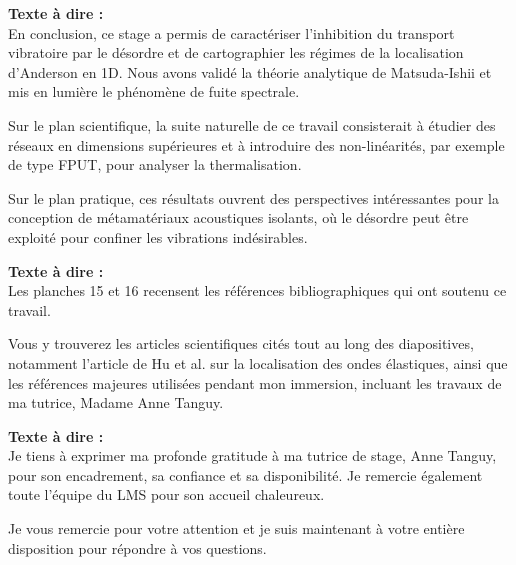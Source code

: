 \documentclass[11pt,a4paper]{article}
\begin{document}
\begin{tcolorbox}[colback=blue!5,colframe=blue!75!black,title=Slide 2 : Table des Matières --- 0:45 à 1:15]
\begin{tcolorbox}[colback=blue!5,colframe=blue!75!black,title=Slide 14 : Conclusion et Perspectives --- 13:00 à 14:15]
\textbf{Texte à dire :} \\
\og  En conclusion, ce stage a permis de caractériser l'inhibition du transport vibratoire par le désordre et de cartographier les régimes de la localisation d'Anderson en 1D. Nous avons validé la théorie analytique de Matsuda-Ishii et mis en lumière le phénomène de fuite spectrale.

Sur le plan scientifique, la suite naturelle de ce travail consisterait à étudier des réseaux en dimensions supérieures et à introduire des non-linéarités, par exemple de type FPUT, pour analyser la thermalisation. 

Sur le plan pratique, ces résultats ouvrent des perspectives intéressantes pour la conception de métamatériaux acoustiques isolants, où le désordre peut être exploité pour confiner les vibrations indésirables. \fg{}
\end{tcolorbox}

\begin{tcolorbox}[colback=blue!5,colframe=blue!75!black,title=Slides 15-16 : Références --- 14:15 à 14:45]
\textbf{Texte à dire :} \\
\og  Les planches 15 et 16 recensent les références bibliographiques qui ont soutenu ce travail. 

Vous y trouverez les articles scientifiques cités tout au long des diapositives, notamment l'article de Hu et al. sur la localisation des ondes élastiques, ainsi que les références majeures utilisées pendant mon immersion, incluant les travaux de ma tutrice, Madame Anne Tanguy. \fg{}
\end{tcolorbox}

\begin{tcolorbox}[colback=blue!5,colframe=blue!75!black,title=Slide 17 : Page de Remerciements \& Q\&A --- 14:45 à 15:00]
\textbf{Texte à dire :} \\
\og  Je tiens à exprimer ma profonde gratitude à ma tutrice de stage, Anne Tanguy, pour son encadrement, sa confiance et sa disponibilité. Je remercie également toute l'équipe du LMS pour son accueil chaleureux. 

Je vous remercie pour votre attention et je suis maintenant à votre entière disposition pour répondre à vos questions. \fg{}
\end{tcolorbox}

\newpage


\end{tcolorbox}
\end{document}

